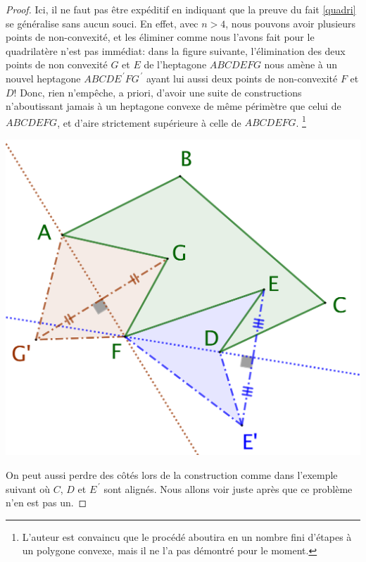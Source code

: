 \begin{proof}
	Ici, il ne faut pas être expéditif en indiquant que la preuve du fait \ref{quadri} se généralise sans aucun souci.
	En effet, avec $n > 4$, nous pouvons avoir plusieurs points de non-convexité, et les éliminer comme nous l'avons fait pour le quadrilatère n'est pas immédiat:
	dans la figure suivante, l'élimination des deux points de non convexité $G$ et $E$ de l'heptagone $ABCDEFG$ nous amène à un nouvel heptagone $ABCDE^{\,\prime}FG^{\,\prime}$ ayant lui aussi deux points de non-convexité $F$ et $D$!
	Donc, rien n'empêche, a priori, d'avoir une suite de constructions n'aboutissant jamais à un heptagone convexe
	de même périmètre que celui de $ABCDEFG$, et d'aire strictement supérieure à celle de $ABCDEFG$.%
	\footnote{
		L'auteur est convaincu que le procédé aboutira en un nombre fini d'étapes à un polygone convexe, mais il ne l'a pas démontré pour le moment.
	}

	\begin{center}
		\includegraphics[scale=.4]{content/polygon/polygon-non-convex-trap.png}
	\end{center}
	

	On peut aussi perdre des côtés lors de la construction comme dans l'exemple suivant où $C$, $D$ et $E^{\,\prime}$ sont alignés. Nous allons voir juste après que ce problème n'en est pas un.


\end{proof}
